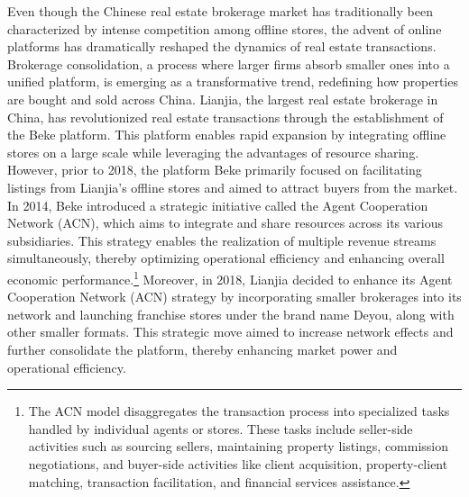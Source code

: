\documentclass[11pt]{article}
\begin{document}
Even though the Chinese real estate brokerage market has traditionally been characterized by intense competition among offline stores, the advent of online platforms has dramatically reshaped the dynamics of real estate transactions. Brokerage consolidation, a process where larger firms absorb smaller ones into a unified platform, is emerging as a transformative trend, redefining how properties are bought and sold across China. Lianjia, the largest real estate brokerage in China, has revolutionized real estate transactions through the establishment of the Beke platform. This platform enables rapid expansion by integrating offline stores on a large scale while leveraging the advantages of resource sharing. However, prior to 2018, the platform Beke primarily focused on facilitating listings from Lianjia's offline stores and aimed to attract buyers from the market. In 2014, Beke introduced a strategic initiative called the Agent Cooperation Network (ACN), which aims to integrate and share resources across its various subsidiaries. This strategy enables the realization of multiple revenue streams simultaneously, thereby optimizing operational efficiency and enhancing overall economic performance.\footnote{The ACN model disaggregates the transaction process into specialized tasks handled by individual agents or stores. These tasks include seller-side activities such as sourcing sellers, maintaining property listings, commission negotiations, and buyer-side activities like client acquisition, property-client matching, transaction facilitation, and financial services assistance.} Moreover, in 2018, Lianjia decided to enhance its Agent Cooperation Network (ACN) strategy by incorporating smaller brokerages into its network and launching franchise stores under the brand name Deyou, along with other smaller formats. This strategic move aimed to increase network effects and further consolidate the platform, thereby enhancing market power and operational efficiency.
\end{document}
